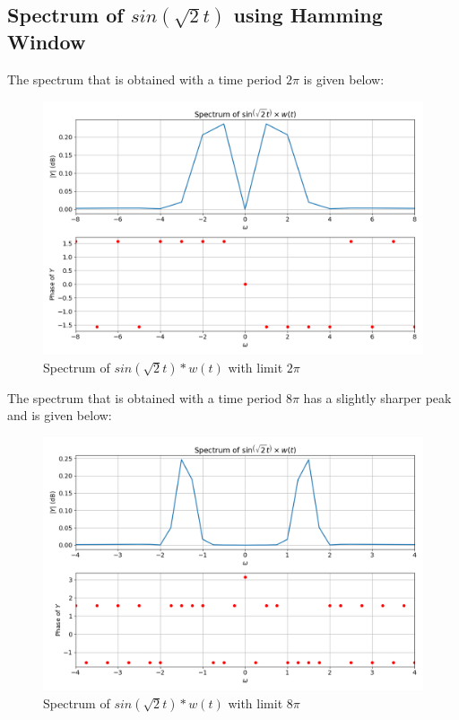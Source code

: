 \documentclass[11pt, a4paper]{article}
\begin{document}
\clearpage

\subsection{Spectrum of $sin(\sqrt{2}t)$ using Hamming Window} 

The spectrum that is obtained with a time period $2\pi$ is given below:

\begin{figure}[!tbh]
\centering
\includegraphics[scale=0.4]{plots/sin_sqrt2_window1.png}
\caption{Spectrum of $sin(\sqrt{2}t)*w(t)$ with limit $2\pi$}
\label{fig:6}
\end{figure}

The spectrum that is obtained with a time period $8\pi$ has a slightly sharper peak and is given below:


\begin{figure}[!tbh]
\centering
\includegraphics[scale=0.4]{plots/sin_sqrt2_window2.png}
\caption{Spectrum of $sin(\sqrt{2}t)*w(t)$ with limit $8\pi$}
\label{fig:7}
\end{figure}
\end{document}
